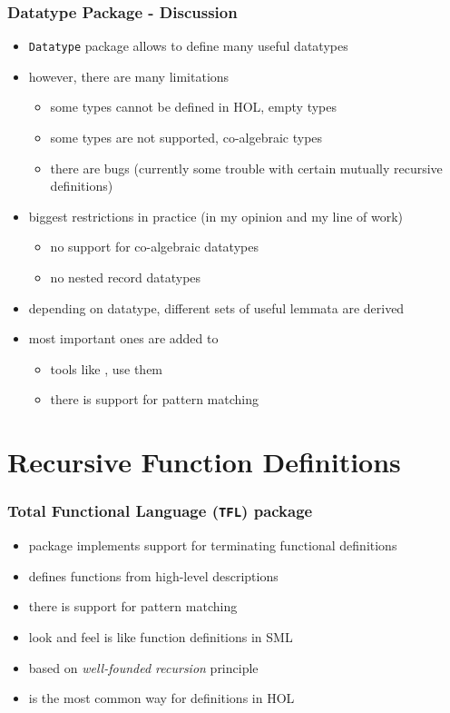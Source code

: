 \begin{frame}[fragile]
\frametitle{Datatype Package - Discussion}

\begin{itemize}
\item \texttt{Datatype} package allows to define many useful datatypes
\item however, there are many limitations
\begin{itemize}
\item some types cannot be defined in HOL, \eg empty types
\item some types are not supported, \eg co-algebraic types
\item there are bugs (currently \eg some trouble with certain mutually recursive definitions)
\end{itemize}
\item biggest restrictions in practice (in my opinion and my line of work)
\begin{itemize}
\item no support for co-algebraic datatypes
\item no nested record datatypes
\end{itemize}
\item depending on datatype, different sets of useful lemmata are derived
\item most important ones are added to 
\begin{itemize}
\item tools like ,  use them
\item there is support for pattern matching
\end{itemize}
\end{itemize}
\end{frame}


\section{Recursive Function Definitions}

\begin{frame}
\frametitle{Total Functional Language (\texttt{TFL}) package}
\begin{itemize}
\item {} package implements support for terminating functional definitions
\item {} defines functions from high-level descriptions
\item there is support for pattern matching
\item look and feel is like function definitions in SML
\item based on \emph{well-founded recursion} principle
\item {} is the most common way for definitions in HOL
\end{itemize}
\end{frame}


